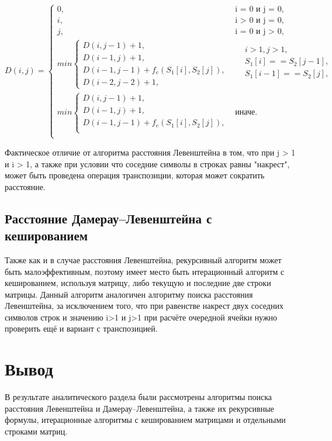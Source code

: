 \begin{equation}
	\label{eq:Dd}
	D(i, j) = 
	\begin{cases}
		0, &\text{i = 0 и j = 0},\\
		i, &\text{i > 0 и j = 0},\\
		j, &\text{i = 0 и j > 0},\\
		min \begin{cases}
			D(i, j - 1) + 1,\\
			D(i - 1, j) + 1,\\
			D(i - 1, j - 1) + f_e(S_1[i], S_2[j]),\\
			D(i - 2, j - 2) + 1,
		\end{cases} & \begin{aligned}
		&i > 1,  j > 1, \\ 
		&S_1[i] == S_2[j - 1], \\
		&S_1[i - 1] == S_2[j],\\
		\end{aligned} \\
		min \begin{cases}
			D(i, j - 1) + 1,\\
			D(i - 1, j) + 1,\\
			D(i - 1, j - 1) + f_e(S_1[i], S_2[j]),\\
		\end{cases} &\text{иначе.}\\
	\end{cases}
\end{equation}

Фактическое отличие от алгоритма расстояния Левенштейна в том, что при j > 1 и i > 1, а также при условии что соседние символы в строках равны "накрест", может быть проведена операция транспозиции, которая может сократить расстояние.

\subsection{Расстояние Дамерау–Левенштейна с кешированием}
Также как и в случае расстояния Левенштейна, рекурсивный алгоритм может быть малоэффективным, поэтому имеет место быть итерационный алгоритм с кешированием, используя матрицу, либо текущую и последние две строки матрицы. Данный алгоритм аналогичен алгоритму поиска расстояния Левенштейна, за исключением того, что при равенстве накрест двух соседних символов строк и значению i>1 и j>1 при расчёте очередной ячейки нужно проверить ещё и вариант с транспозицией.


\section*{Вывод}
В результате аналитического раздела были рассмотрены алгоритмы поиска расстояния Левенштейна и Дамерау–Левенштейна, а также их рекурсивные формулы, итерационные алгоритмы с кешированием матрицами и отдельными строками матриц.

\clearpage
